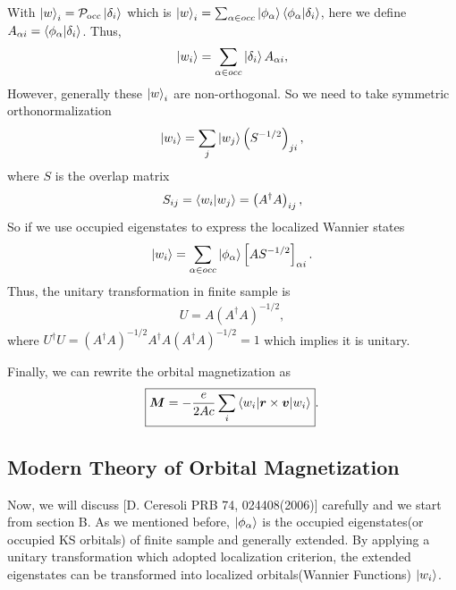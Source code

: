 \documentclass[12pt, oneside]{article}
\numberwithin{equation}{subsection}
\begin{document}
With \(\ket{w}_{i} = \mathcal{P}_{\mathrm{occ}} \ket{\delta_{i}}\) which is \(\ket{w}_{i} = \sum_{\alpha \in occ} \ket{\phi_{\alpha}} \braket{\phi_{\alpha} | \delta_{i}}\), here we define \(A_{\alpha i} = \braket{\phi_{\alpha} | \delta_{i}}\). Thus,  
\begin{align}
	\ket{w_{i} }=   \sum_{\alpha \in occ}  \ket{\delta_{i}} A_{\alpha i} ,
\end{align}
However, generally these \(\ket{w}_{i}\) are non-orthogonal. So we need to take symmetric orthonormalization 
\begin{align}
	\ket{w_{i}} = \sum_{j} \ket{w_{j}}\left(S^{-1/2}\right)_{ji}, 
\end{align}
where \(S\) is the overlap matrix 
\begin{align}
	S_{ij} = \braket{w_i|w_j} = \left(A^{\dagger} A\right)_{ij},
\end{align}
So if we use occupied eigenstates to express the localized Wannier states 
\begin{align}
	\ket{w_{i} }= \sum_{\alpha \in occ} \ket{\phi_{\alpha}} \left[A S^{-1/2}\right]_{\alpha i}.
\end{align}
Thus, the unitary transformation in finite sample is 
\begin{align}
	\boxed{
		U = A \left(A^\dagger A\right)^{-1/2},
	}
\end{align}
where \(U^\dagger U = \left(A^\dagger A\right)^{-1/2} A^\dagger A \left(A^\dagger A\right)^{-1/2} = 1\) which implies it is unitary.

\vspace{1em}


\vspace{1em}

Finally, we can rewrite the orbital magnetization as 
\begin{equation}
	\boxed{
		\bm{M} = -\frac{e}{2A c}\sum_i\braket{w_i|\bm{r}\times\bm{v}|w_i}
	}.
\end{equation}


\subsection{Modern Theory of Orbital Magnetization}
Now, we will discuss [D. Ceresoli PRB 74, 024408(2006)] carefully and we start from section B. As we mentioned before, \(\ket{\phi_{\alpha}}\) is the occupied eigenstates(or occupied KS orbitals) of finite sample and generally extended. By applying a unitary transformation which adopted localization criterion, the extended eigenstates can be transformed into localized orbitals(Wannier Functions) \(\ket{w_i}\).
\end{document}
